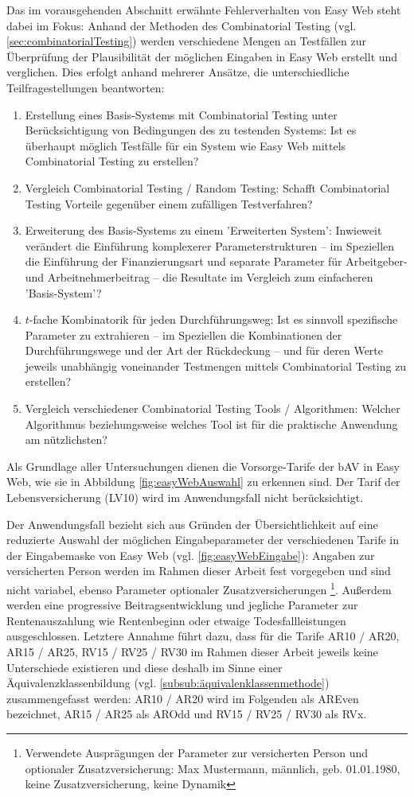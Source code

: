 Das im vorausgehenden Abschnitt erwähnte Fehlerverhalten von Easy Web steht dabei im Fokus: Anhand der Methoden des Combinatorial Testing (vgl. \autoref{sec:combinatorialTesting}) werden verschiedene Mengen an Testfällen zur Überprüfung der Plausibilität der möglichen Eingaben in Easy Web erstellt und verglichen. Dies erfolgt anhand mehrerer Ansätze, die unterschiedliche Teilfragestellungen beantworten:
\begin{enumerate}
\item Erstellung eines \glqq Basis-Systems\grqq{} mit Combinatorial Testing unter Berücksichtigung von Bedingungen des zu testenden Systems: Ist es überhaupt möglich Testfälle für ein System wie Easy Web mittels Combinatorial Testing zu erstellen?
\item Vergleich Combinatorial Testing / Random Testing: Schafft Combinatorial Testing Vorteile gegenüber einem zufälligen Testverfahren?
\item Erweiterung des \glqq Basis-Systems\grqq{} zu einem 'Erweiterten System': Inwieweit verändert die Einführung komplexerer Parameterstrukturen -- im Speziellen die Einführung der Finanzierungsart und separate Parameter für Arbeitgeber- und Arbeitnehmerbeitrag -- die Resultate im Vergleich zum einfacheren 'Basis-System'?
\item $t$-fache Kombinatorik für jeden Durchführungsweg: Ist es sinnvoll spezifische Parameter zu extrahieren -- im Speziellen die Kombinationen der Durchführungswege und der Art der Rückdeckung -- und für deren Werte jeweils unabhängig voneinander Testmengen mittels Combinatorial Testing zu erstellen?
\item Vergleich verschiedener Combinatorial Testing Tools / Algorithmen: Welcher Algorithmus beziehungsweise welches Tool ist für die praktische Anwendung am nützlichsten?
\end{enumerate}

Als Grundlage aller Untersuchungen dienen die \glqq Vorsorge-Tarife\grqq{} der bAV in Easy Web, wie sie in Abbildung \ref{fig:easyWebAuswahl} zu erkennen sind. Der Tarif der Lebensversicherung (LV10) wird im Anwendungsfall nicht berücksichtigt. 

Der Anwendungsfall bezieht sich aus Gründen der Übersichtlichkeit auf eine reduzierte Auswahl der möglichen Eingabeparameter der verschiedenen Tarife in der Eingabemaske von Easy Web (vgl. \autoref{fig:easyWebEingabe}): Angaben zur versicherten Person werden im Rahmen dieser Arbeit fest vorgegeben und sind nicht variabel, ebenso Parameter optionaler Zusatzversicherungen \footnote{Verwendete Ausprägungen der Parameter zur versicherten Person und optionaler Zusatzversicherung: Max Mustermann, männlich, geb. 01.01.1980, keine Zusatzversicherung, keine Dynamik}. Außerdem werden eine progressive Beitragsentwicklung und jegliche Parameter zur Rentenauszahlung wie Rentenbeginn oder etwaige Todesfallleistungen ausgeschlossen. Letztere Annahme führt dazu, dass für die Tarife AR10 / AR20, AR15 / AR25, RV15 / RV25 / RV30 im Rahmen dieser Arbeit jeweils keine Unterschiede existieren und diese deshalb im Sinne einer Äquivalenzklassenbildung (vgl. \autoref{subsub:äquivalenklassenmethode}) zusammengefasst werden: AR10 / AR20 wird im Folgenden als AREven bezeichnet, AR15 / AR25 als AROdd und RV15 / RV25 / RV30 als RVx. 

